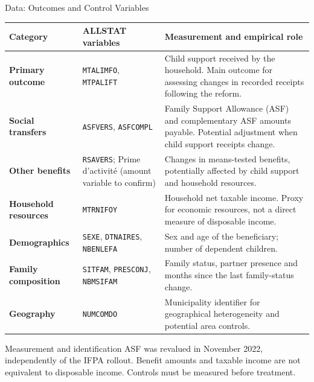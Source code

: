 \documentclass[aspectratio=169,10pt]{beamer}
\begin{document}
\begin{frame}{Data: Outcomes and Control Variables}

\scriptsize
\renewcommand{\arraystretch}{1.18}
\setlength{\tabcolsep}{4pt}

\begin{tabularx}{\textwidth}{
>{\bfseries}p{2.3cm} p{3.6cm} X
}
\toprule
Category & ALLSTAT variables & Measurement and empirical role \\
\midrule

Primary outcome &
\texttt{MTALIMFO}, \texttt{MTPALIFT} &
Child support received by the household.
Main outcome for assessing changes in recorded
receipts following the reform. \\

Social transfers &
\texttt{ASFVERS}, \texttt{ASFCOMPL} &
Family Support Allowance (ASF) and complementary
ASF amounts payable. Potential adjustment
when child support receipts change. \\

Other benefits &
\texttt{RSAVERS}; Prime d'activit\'e
(amount variable to confirm) &
Changes in means-tested benefits,
potentially affected by child support
and household resources. \\

Household resources &
\texttt{MTRNIFOY} &
Household net taxable income.
Proxy for economic resources, not a direct
measure of disposable income. \\

Demographics &
\texttt{SEXE}, \texttt{DTNAIRES},
\texttt{NBENLEFA} &
Sex and age of the beneficiary;
number of dependent children. \\

Family composition &
\texttt{SITFAM}, \texttt{PRESCONJ},
\texttt{NBMSIFAM} &
Family status, partner presence and
months since the last family-status change. \\

Geography &
\texttt{NUMCOMDO} &
Municipality identifier for geographical
heterogeneity and potential area controls. \\

\bottomrule
\end{tabularx}

\vspace{0.12cm}

\begin{block}{Measurement and identification}
\scriptsize
ASF was revalued in November 2022, independently
of the IFPA rollout. Benefit amounts and taxable
income are not equivalent to disposable income.
Controls must be measured before treatment.
\end{block}

\end{frame}
\end{document}
